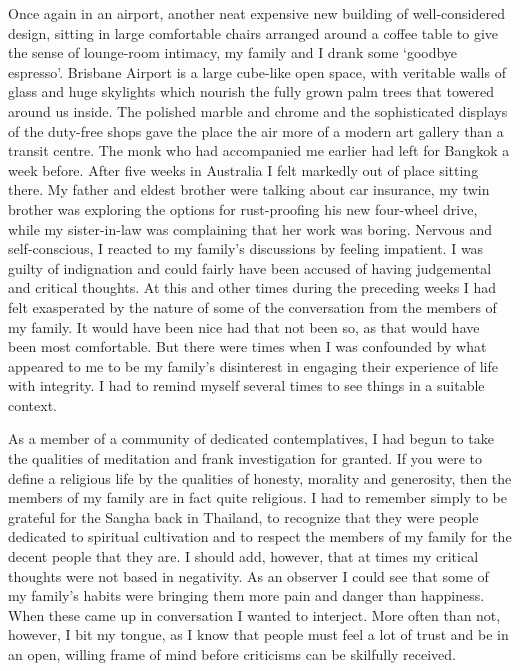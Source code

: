 Once again in an airport, another neat expensive new building of
well-considered design, sitting in large comfortable chairs arranged
around a coffee table to give the sense of lounge-room intimacy, my
family and I drank some `goodbye espresso'. Brisbane Airport is a large
cube-like open space, with veritable walls of glass and huge skylights
which nourish the fully grown palm trees that towered around us inside.
The polished marble and chrome and the sophisticated displays of the
duty-free shops gave the place the air more of a modern art gallery than
a transit centre. The monk who had accompanied me earlier had left for
Bangkok a week before. After five weeks in Australia I felt markedly out
of place sitting there. My father and eldest brother were talking about
car insurance, my twin brother was exploring the options for
rust-proofing his new four-wheel drive, while my sister-in-law was
complaining that her work was boring. Nervous and self-conscious, I
reacted to my family's discussions by feeling impatient. I was guilty of
indignation and could fairly have been accused of having judgemental and
critical thoughts. At this and other times during the preceding weeks I
had felt exasperated by the nature of some of the conversation from the
members of my family. It would have been nice had that not been so, as
that would have been most comfortable. But there were times when I was
confounded by what appeared to me to be my family's disinterest in
engaging their experience of life with integrity. I had to remind myself
several times to see things in a suitable context.

As a member of a community of dedicated contemplatives, I had begun to
take the qualities of meditation and frank investigation for granted. If
you were to define a religious life by the qualities of honesty,
morality and generosity, then the members of my family are in fact quite
religious. I had to remember simply to be grateful for the Sangha back
in Thailand, to recognize that they were people dedicated to spiritual
cultivation and to respect the members of my family for the decent
people that they are. I should add, however, that at times my critical
thoughts were not based in negativity. As an observer I could see that
some of my family's habits were bringing them more pain and danger than
happiness. When these came up in conversation I wanted to interject.
More often than not, however, I bit my tongue, as I know that people
must feel a lot of trust and be in an open, willing frame of mind before
criticisms can be skilfully received.

